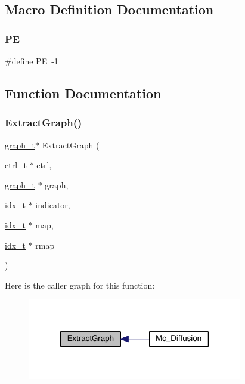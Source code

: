 \subsection{Macro Definition Documentation}
\mbox{\label{a00371_a211238ffe3627f42ca7b04bc96cc8fa6}} 
\subsubsection{\texorpdfstring{PE}{PE}}
{\footnotesize\ttfamily \#define PE~-\/1}



\subsection{Function Documentation}
\mbox{\label{a00371_a78ca75095aef9df3b79518a334846184}} 
\subsubsection{\texorpdfstring{Extract\+Graph()}{ExtractGraph()}}
{\footnotesize\ttfamily \hyperlink{a00734}{graph\+\_\+t}$\ast$ Extract\+Graph (\begin{DoxyParamCaption}\item[{\hyperlink{a00742}{ctrl\+\_\+t} $\ast$}]{ctrl,  }\item[{\hyperlink{a00734}{graph\+\_\+t} $\ast$}]{graph,  }\item[{\hyperlink{a00876_aaa5262be3e700770163401acb0150f52}{idx\+\_\+t} $\ast$}]{indicator,  }\item[{\hyperlink{a00876_aaa5262be3e700770163401acb0150f52}{idx\+\_\+t} $\ast$}]{map,  }\item[{\hyperlink{a00876_aaa5262be3e700770163401acb0150f52}{idx\+\_\+t} $\ast$}]{rmap }\end{DoxyParamCaption})}

Here is the caller graph for this function\+:\nopagebreak
\begin{figure}[H]
\begin{center}
\leavevmode
\includegraphics[width=266pt]{a00371_a78ca75095aef9df3b79518a334846184_icgraph}
\end{center}
\end{figure}
\mbox{\label{a00371_a784a5e869479c028b824831459261587}} 
